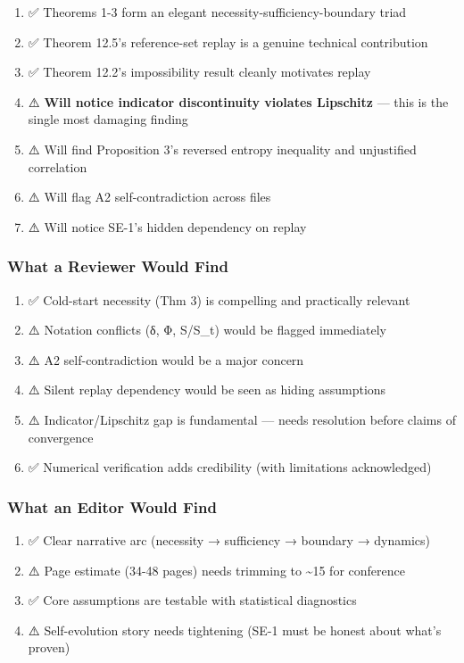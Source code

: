 \documentclass[
  12pt,
]{ctexart}
\providecommand{\tightlist}{%
  \setlength{\itemsep}{0pt}\setlength{\parskip}{0pt}}
\begin{document}
\begin{enumerate}
\def\labelenumi{\arabic{enumi}.}
\tightlist
\item
  ✅ Theorems 1-3 form an elegant necessity-sufficiency-boundary triad
\item
  ✅ Theorem 12.5's reference-set replay is a genuine technical
  contribution
\item
  ✅ Theorem 12.2's impossibility result cleanly motivates replay
\item
  ⚠️ \textbf{Will notice indicator discontinuity violates Lipschitz} ---
  this is the single most damaging finding
\item
  ⚠️ Will find Proposition 3's reversed entropy inequality and
  unjustified correlation
\item
  ⚠️ Will flag A2 self-contradiction across files
\item
  ⚠️ Will notice SE-1's hidden dependency on replay
\end{enumerate}

\subsubsection{What a Reviewer Would
Find}\label{what-a-reviewer-would-find}

\begin{enumerate}
\def\labelenumi{\arabic{enumi}.}
\tightlist
\item
  ✅ Cold-start necessity (Thm 3) is compelling and practically relevant
\item
  ⚠️ Notation conflicts (δ, Φ, S/S\_t) would be flagged immediately
\item
  ⚠️ A2 self-contradiction would be a major concern
\item
  ⚠️ Silent replay dependency would be seen as hiding assumptions
\item
  ⚠️ Indicator/Lipschitz gap is fundamental --- needs resolution before
  claims of convergence
\item
  ✅ Numerical verification adds credibility (with limitations
  acknowledged)
\end{enumerate}

\subsubsection{What an Editor Would
Find}\label{what-an-editor-would-find}

\begin{enumerate}
\def\labelenumi{\arabic{enumi}.}
\tightlist
\item
  ✅ Clear narrative arc (necessity → sufficiency → boundary → dynamics)
\item
  ⚠️ Page estimate (34-48 pages) needs trimming to \textasciitilde15 for
  conference
\item
  ✅ Core assumptions are testable with statistical diagnostics
\item
  ⚠️ Self-evolution story needs tightening (SE-1 must be honest about
  what's proven)
\end{enumerate}
\end{document}
